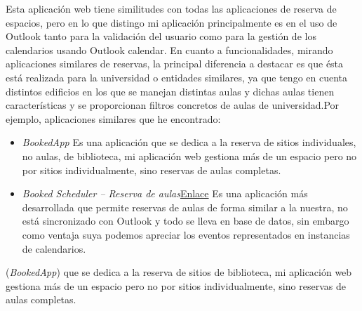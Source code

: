 
Esta aplicación web tiene similitudes con todas las aplicaciones de reserva de espacios, pero en lo que distingo mi aplicación principalmente es en el uso de Outlook tanto para la validación del usuario como para la gestión de los calendarios usando Outlook calendar.\newline
En cuanto a funcionalidades, mirando aplicaciones similares de reservas, la principal diferencia a destacar es que ésta está realizada para la universidad o entidades similares, ya que tengo en cuenta distintos edificios en los que se manejan distintas aulas y dichas aulas tienen características y se proporcionan filtros concretos de aulas de universidad.\newline Por ejemplo, aplicaciones similares que he encontrado:
\begin{itemize}
    \item \textit{BookedApp}\newline 
    Es una aplicación que se dedica a la reserva de sitios individuales, no aulas, de biblioteca, mi aplicación web gestiona más de un espacio pero no por sitios individualmente, sino reservas de aulas completas.
    \item  \textit{Booked Scheduler – Reserva de aulas}\href{https://valentingom.wordpress.com/2016/07/10/booked-scheduler-reservas/}{Enlace}\cite{BookedScheduler} \newline
    Es una aplicación más desarrollada que permite reservas de aulas de forma similar a la nuestra, no está sincronizado con Outlook y todo se lleva en base de datos, sin embargo como ventaja suya podemos apreciar los eventos representados en instancias de calendarios.
\end{itemize}
(\textit{BookedApp}) que se dedica a la reserva de sitios de biblioteca, mi aplicación web gestiona más de un espacio pero no por sitios individualmente, sino reservas de aulas completas.\newline

